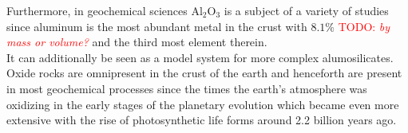 \documentclass[11pt,DIV=13,BCOR=5mm,a4paper,headinclude]{scrbook}
\newcommand\todo[1]{\textcolor{red}{TODO: \textit{{#1}}}}
\begin{document}
Furthermore, in geochemical sciences Al$_2$O$_3$ is a subject of a variety of studies since aluminum is the most abundant metal in the crust with  $8.1\%$ \todo{by mass or volume?}
and the third most element therein\cite{dtv-Atlas,Riedel}.
\\
It can additionally be seen as a model system for more complex alumosilicates.
Oxide rocks are omnipresent in the crust of the earth and henceforth are present in most geochemical processes since the times the earth's atmosphere was oxidizing in the early stages of the planetary evolution\cite{Trail2011} which became even more extensive with the rise of photosynthetic life forms\cite{Frei2009,Buick2008,Olson2006} around 2.2 billion years ago\cite{Kirschvink2008}.
\\


\end{document}
